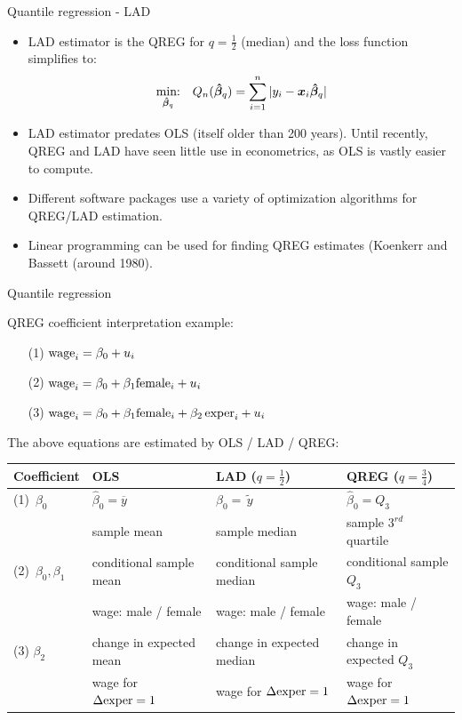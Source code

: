 \documentclass{beamer}
\begin{document}
\begin{frame}{Quantile regression - LAD}
\begin{itemize}
\item LAD estimator is the QREG for $q=\tfrac{1}{2}$ (median) and the loss function simplifies to: $$
\underset{\bm{\hat{\beta}}_{q}}{\textnormal{min:}} \quad Q_n(\bm{\hat{\beta}}_{q}) =
\sum_{i=1}^n |y_i-\bm{x}_i\bm{\hat{\beta}}_{q}|
$$
\item LAD estimator predates OLS (itself older than 200 years). Until recently, QREG and LAD have seen little use in econometrics, as OLS is vastly easier to compute.
\item Different software packages use a variety of optimization algorithms for QREG/LAD estimation.
\item Linear programming can be used for finding QREG estimates (Koenkerr and Bassett (around 1980).
\end{itemize}
\end{frame}
\begin{frame}{Quantile regression}

QREG coefficient interpretation example:\\
\bigskip
\begin{itemize}
    \item[(1)] $\textnormal{wage}_i = \beta_0 + u_i$
    \item[(2)] $\textnormal{wage}_i = \beta_0 + \beta_1 \textnormal{female}_i + u_i$
    \item[(3)] $\textnormal{wage}_i = \beta_0 + \beta_1 \textnormal{female}_i + \beta_2 \, \textnormal{exper}_i + u_i$
\end{itemize}
\bigskip
The above equations are estimated by OLS / LAD / QREG:\\
\bigskip
\tiny
\begin{tabular}{|l| l |l |l|}
 \hline
 Coefficient   &     OLS     &   LAD ($q=\tfrac{1}{2}$)   &  QREG ($q=\tfrac{3}{4}$)\\
 \hline 
 (1)~$\beta_0$ &   $\hat{\beta}_0=\overline{y}$ & $\hat{\beta}_0=\tilde{\,y\,}$ & $\hat{\beta}_0=Q_3$\\
 & sample mean  & sample median & sample $3^{rd}$ quartile\\
 \hline
 (2)~$\beta_0, \beta_1$ & conditional sample mean & conditional sample median & conditional sample $Q_3$\\
  & wage: male / female & wage: male / female & wage: male / female \\
  \hline
  (3) $\beta_2$ & change in expected mean & change in expected median & change in expected $Q_3$\\
   & wage for $\Delta\textnormal{exper}=1$ & wage for $\Delta\textnormal{exper}=1$ & wage for $\Delta\textnormal{exper}=1$\\
   \hline
\end{tabular}
\end{frame}
\end{document}
